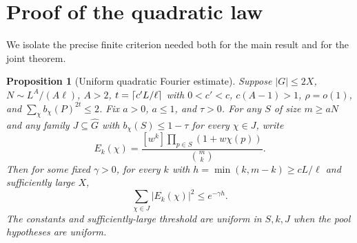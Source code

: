 \documentclass[11pt]{article}
\newtheorem{proposition}[theorem]{Proposition}
\theoremstyle{remark}\newtheorem{remark}[theorem]{Remark}
\begin{document}
\section{Proof of the quadratic law}
\label{sec:proof}
We isolate the precise finite criterion needed both for the main result and for the joint theorem.
\begin{proposition}[Uniform quadratic Fourier estimate]\label{prop:quad}
Suppose $|G|\le2X$, $N\sim L^A/(A\ell)$, $A>2$, $t=\lceil c'L/\ell\rceil$ with $0<c'<c$, $c(A-1)>1$, $\rho=o(1)$, and $\sum_\chi b_\chi(P)^{2t}\le2$. Fix $a>0$, $a\le1$, and $\tau>0$. For any $S$ of size $m\ge aN$ and any family $J\subseteq\widehat G$ with $b_\chi(S)\le1-\tau$ for every $\chi\in J$, write
\[
 E_k(\chi)=\frac{[w^k]\prod_{p\in S}(1+w\chi(p))}{\binom mk}.
\]
Then for some fixed $\gamma>0$, for every $k$ with $h=\min(k,m-k)\ge cL/\ell$ and sufficiently large $X$,
\begin{equation}\label{eq:quad}
 \sum_{\chi\in J}|E_k(\chi)|^2\le e^{-\gamma h}.
\end{equation}
The constants and sufficiently-large threshold are uniform in $S,k,J$ when the pool hypotheses are uniform.
\end{proposition}
\end{document}
